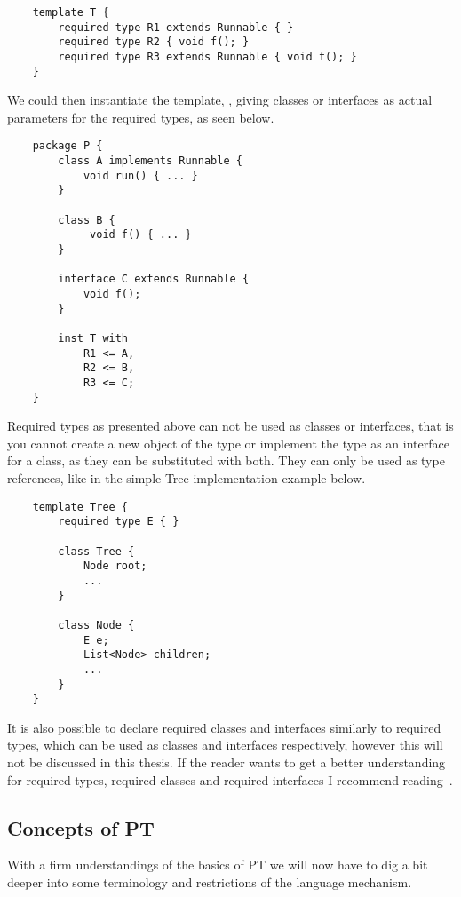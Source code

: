 \begin{verbatim}
    template T {
        required type R1 extends Runnable { }
        required type R2 { void f(); }
        required type R3 extends Runnable { void f(); }
    }
\end{verbatim}

We could then instantiate the template, , giving classes or interfaces as actual parameters for the required types, as seen below.

\begin{verbatim}
    package P {
        class A implements Runnable {
            void run() { ... }
        }

        class B {
             void f() { ... }
        }

        interface C extends Runnable {
            void f();
        }

        inst T with
            R1 <= A,
            R2 <= B,
            R3 <= C;
    }
\end{verbatim}

Required types as presented above can not be used as classes or interfaces, that is you cannot create a new object of the type or implement the type as an interface for a class, as they can be substituted with both.
They can only be used as type references, like in the simple Tree implementation example below.

\begin{verbatim}
    template Tree {
        required type E { }

        class Tree {
            Node root;
            ...
        }

        class Node {
            E e;
            List<Node> children;
            ...
        }
    }
\end{verbatim}

It is also possible to declare required classes and interfaces similarly to required types, which can be used as classes and interfaces respectively, however this will not be discussed in this thesis.
If the reader wants to get a better understanding for required types, required classes and required interfaces I recommend reading~\cite{requiredtypes}.

\subsection{Concepts of PT}\label{subsec:advanced-topics-of-pt}

With a firm understandings of the basics of PT we will now have to dig a bit deeper into some terminology and restrictions of the language mechanism.

